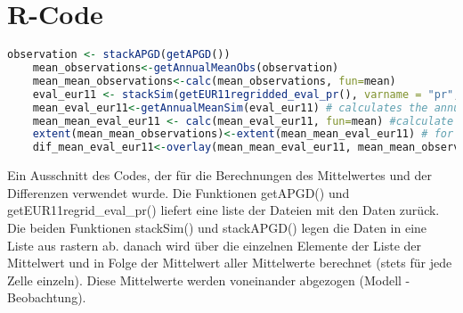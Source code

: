 \section{R-Code}
\begin{lstlisting}[language=R]
	observation <- stackAPGD(getAPGD())
	mean_observations<-getAnnualMeanObs(observation)
	mean_mean_observations<-calc(mean_observations, fun=mean)
	eval_eur11 <- stackSim(getEUR11regridded_eval_pr(), varname = "pr", factor = 3600*24) # factor for the precipitation-unit
	mean_eval_eur11<-getAnnualMeanSim(eval_eur11) # calculates the annual mean and places it in a raster (=>10years==10layers)
	mean_mean_eval_eur11 <- calc(mean_eval_eur11, fun=mean) #calculate the mean over all years
	extent(mean_mean_observations)<-extent(mean_mean_eval_eur11) # for better representation
	dif_mean_eval_eur11<-overlay(mean_mean_eval_eur11, mean_mean_observations,fun=function(x,y){return((x - y))}) #subtract each grid-cell
\end{lstlisting}
Ein Ausschnitt des Codes, der für die Berechnungen des Mittelwertes und der Differenzen verwendet wurde. Die Funktionen getAPGD() und getEUR11regrid\_eval\_pr() liefert eine liste der Dateien mit den Daten zurück. Die beiden Funktionen stackSim() und stackAPGD() legen die Daten in eine Liste aus rastern ab. danach wird über die einzelnen Elemente der Liste der Mittelwert und in Folge der Mittelwert aller Mittelwerte berechnet (stets für jede Zelle einzeln). Diese Mittelwerte werden voneinander abgezogen (Modell - Beobachtung).